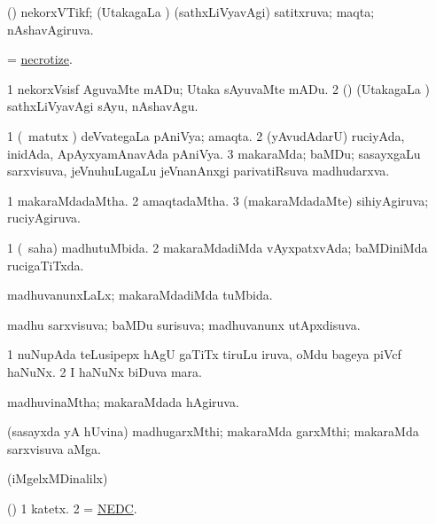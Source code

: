 \bentry
{}
\gl{\gu}
\bmng
(\veYshA) nekorxVTikf; (UtakagaLa \vi) (sathxLiVyavAgi) satitxruva; maqta; nAshavAgiruva. 
\emng
\eentry

\bentry
{}
\gl{\sakirx}
\bmng
= \hyperlink{necrotize}{necrotize}. 
\emng
\eentry

\bentry
{}
\gl{\sakirx}
\bmng
\bnum
\num{1} nekorxVsisf AguvaMte mADu; Utaka sAyuvaMte mADu. 
\num{2} (\veYshA) (UtakagaLa \vi) sathxLiVyavAgi sAyu, nAshavAgu. 
\enum
\emng
\eentry

\bentry
{}
\gl{\nA}
\bmng
\bnum
\num{1} (\girxVpu\ matutx \roVpu) deVvategaLa pAniVya; amaqta. 
\num{2} (yAvudAdarU) ruciyAda, inidAda, ApAyxyamAnavAda pAniVya. 
\num{3} makaraMda; baMDu; sasayxgaLu sarxvisuva, jeVnuhuLugaLu jeVnanAnxgi parivatiRsuva madhudarxva. 
\enum
\emng
\eentry

\bentry
{}
\gl{\gu}
\bmng
\bnum
\num{1} makaraMdadaMtha. 
\num{2} amaqtadaMtha. 
\num{3} (makaraMdadaMte) sihiyAgiruva; ruciyAgiruva. 
\enum
\emng
\eentry

\bentry
{}
\gl{\gu}
\bmng
\bnum
\num{1} (\rUpa\ saha) madhutuMbida. 
\num{2} makaraMdadiMda vAyxpatxvAda; baMDiniMda rucigaTiTxda. 
\enum
\emng
\eentry

\bentry
{}
\gl{\gu}
\bmng
madhuvanunxLaLx; makaraMdadiMda tuMbida. 
\emng
\eentry

\bentry
{}
\gl{\gu}
\bmng
madhu sarxvisuva; baMDu surisuva; madhuvanunx utApxdisuva. 
\emng
\eentry

\bentry
{}
\gl{\nA}
\bmng
\bnum
\num{1} nuNupAda teLusipepx hAgU gaTiTx tiruLu iruva, oMdu bageya piVcf haNuNx. 
\num{2} I haNuNx biDuva mara. 
\enum
\emng
\eentry

\bentry
{}
\gl{\gu}
\bmng
madhuvinaMtha; makaraMdada hAgiruva. 
\emng
\eentry

\bentry
{}
\gl{\nA}
\bmng
(sasayxda yA hUvina) madhugarxMthi; makaraMda garxMthi; makaraMda sarxvisuva aMga. 
\emng
\eentry

\bentry
{}
\gl{\saMkiSx}
\bmng
(iMgelxMDinalilx)  
\emng
\eentry

\bentry
{}
\gl{\nA}
\bmng
(\AmA) 
\bnum
\num{1} katetx. 
\num{2}  = \hyperlink{NEDC}{NEDC}. 
\enum
\emng
\eentry

